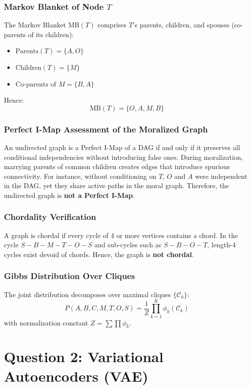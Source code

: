 \documentclass[10pt,journal,compsoc]{IEEEtran}
\begin{document}
\subsubsection{Markov Blanket of Node $T$}
The Markov Blanket $\text{MB}(T)$ comprises $T$'s parents, children, and spouses (co-parents of its children):
\begin{itemize}
    \item $\text{Parents}(T) = \{A, O\}$
    \item $\text{Children}(T) = \{M\}$
    \item $\text{Co-parents of } M = \{B, A\}$
\end{itemize}
Hence:
\begin{equation}
\text{MB}(T) = \{O, A, M, B\}
\end{equation}

\subsubsection{Perfect I-Map Assessment of the Moralized Graph}
An undirected graph is a Perfect I-Map of a DAG if and only if it preserves all conditional independencies without introducing false ones. During moralization, marrying parents of common children creates edges that introduce spurious connectivity. For instance, without conditioning on $T$, $O$ and $A$ were independent in the DAG, yet they share active paths in the moral graph. Therefore, the undirected graph is \textbf{not a Perfect I-Map}.

\subsubsection{Chordality Verification}
A graph is chordal if every cycle of 4 or more vertices contains a chord. In the cycle $S-B-M-T-O-S$ and sub-cycles such as $S-B-O-T$, length-4 cycles exist devoid of chords. Hence, the graph is \textbf{not chordal}.

\subsubsection{Gibbs Distribution Over Cliques}
The joint distribution decomposes over maximal cliques $\{\mathcal{C}_k\}$:
\begin{equation}
P(A,B,C,M,T,O,S) = \frac{1}{Z} \prod_{k=1}^K \phi_k(\mathcal{C}_k)
\end{equation}
with normalization constant $Z = \sum \prod \phi_k$.

\section{Question 2: Variational Autoencoders (VAE)}
\end{document}
